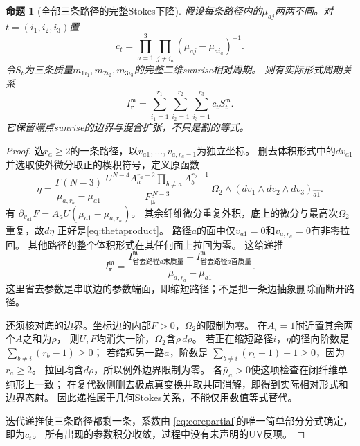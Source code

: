 \documentclass[11pt,a4paper]{ctexart}
\theoremstyle{cnplain}\newtheorem{theorem}{定理}[section]
\newtheorem{proposition}[theorem]{命题}
\theoremstyle{definition}\newtheorem{definition}[theorem]{定义}
\theoremstyle{remark}\newtheorem{remark}[theorem]{注}
\begin{document}
\begin{proposition}[全部三条路径的完整Stokes下降]\label{prop:thetastokes}
假设每条路径内的$\mu_{aj}$两两不同。对
$t=(i_1,i_2,i_3)$置
\[
 c_t=\prod_{a=1}^3\prod_{j\ne i_a}(\mu_{aj}-\mu_{ai_a})^{-1}.
\]
令$S_t$为三条质量$m_{1i_1},m_{2i_2},m_{3i_3}$的完整二维sunrise相对周期。
则有实际形式周期关系
\begin{equation}\label{eq:thetaformal}
 I_{\mathbf r}^{\mathfrak m}=\sum_{i_1=1}^{r_1}
       \sum_{i_2=1}^{r_2}\sum_{i_3=1}^{r_3}c_tS_t^{\mathfrak m}.
\end{equation}
它保留端点sunrise的边界与混合扩张，不只是割的等式。
\end{proposition}
\begin{proof}
选$r_a\ge2$的一条路径，以$v_{a1},\ldots,v_{a,r_a-1}$为独立坐标。
删去体积形式中的$dv_{a1}$并选取使外微分取正的楔积符号，定义原函数
\[
 \eta=
 \frac{\Gamma(N-3)}{\mu_{a,r_a}-\mu_{a1}}\,
 \frac{U^{N-4}A_a^{r_a-2}\prod_{b\ne a}A_b^{r_b-1}}
      {F_{\bar{\boldsymbol\mu}}^{\,N-3}}\,
 \Omega_2\wedge (dv_1\wedge dv_2\wedge dv_3)_{\widehat{a1}} .
\]
有
$\partial_{v_{a1}}F=A_aU(\mu_{a1}-\mu_{a,r_a})$。
其余纤维微分重复外积，底上的微分与最高次$\Omega_2$重复，故$d\eta$
正好是\eqref{eq:thetaproduct}。
路径$a$的面中仅$v_{a1}=0$和$v_{a,r_a}=0$有非零拉回。
其他路径的整个体积形式在其任何面上拉回为零。
这给递推
\[
 I_{\mathbf r}^{\mathfrak m}
 =\frac{I_{\text{省去路径$a$末质量}}^{\mathfrak m}
          -I_{\text{省去路径$a$首质量}}^{\mathfrak m}}
        {\mu_{a,r_a}-\mu_{a1}} .
\]
这里省去参数是串联边的参数端面，即缩短路径；不是把一条边抽象删除而断开路径。

还须核对底的边界。坐标边的内部$F>0$，$\Omega_2$的限制为零。
在$A_i=1$附近置其余两个$A$之和为$\rho$，
则$U,F$均消失一阶，$\Omega_2$含$\rho\,d\rho$。
若正在缩短路径$i$，$\eta$的径向阶数是
$\sum_{b\ne i}(r_b-1)\ge0$；
若缩短另一路$a$，阶数是
$\sum_{b\ne i}(r_b-1)-1\ge0$，因为$r_a\ge2$。
拉回均含$d\rho$，所以例外边界限制为零。
各$\bar\mu_a>0$使这项检查在闭纤维单纯形上一致；
在复代数侧删去极点真变换并取共同消解，即得到实际相对形式和边界态射。
因此递推属于几何Stokes关系，不能仅用数值等式替代。

迭代递推使三条路径都剩一条，系数由
\eqref{eq:corepartial}的唯一简单部分分式确定，即为$c_t$。
所有出现的参数积分收敛，过程中没有未声明的UV反项。
\end{proof}
\end{document}
